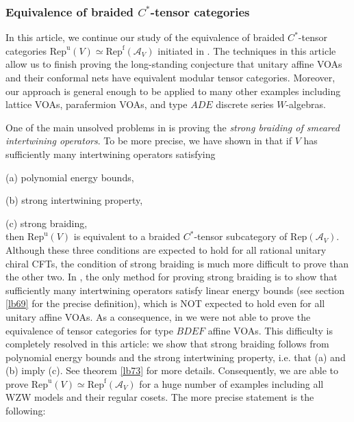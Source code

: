 \documentclass[11pt,b5paper,notitlepage]{article}
\theoremstyle{definition}
\theoremstyle{plain}
\newcommand{\mc}{\mathcal}
\newcommand{\Rep}{\mathrm{Rep}}
\newcommand{\Repu}{\mathrm{Rep}^{\mathrm u}}
\newcommand{\Repf}{\mathrm{Rep}^{\mathrm f}}
\newcommand{\RepuV}{\mathrm{Rep}^{\mathrm u}(V)}
\numberwithin{equation}{subsection}
\begin{document}
\subsubsection*{Equivalence of braided $C^*$-tensor categories}



In this article, we continue our study of the equivalence of braided  $C^*$-tensor categories $\RepuV\simeq\Repf(\mc A_V)$ initiated in \cite{Gui21a}. The techniques in this article allow us to finish proving the long-standing conjecture that unitary affine VOAs and their conformal nets have equivalent modular tensor categories. Moreover, our approach is general enough to be applied to many other examples  including lattice VOAs, parafermion VOAs, and type $ADE$ discrete series $W$-algebras.

One of the main unsolved problems in \cite{Gui21a} is proving the \emph{strong braiding of smeared intertwining operators}. To be more precise, we have shown in \cite{Gui21a}  that if $V$ has sufficiently many intertwining operators satisfying 

(a) polynomial energy bounds, 

(b) strong intertwining property,

(c) strong braiding,\\
then $\RepuV$ is equivalent to a braided $C^*$-tensor subcategory of $\Rep(\mc A_V)$. Although these three conditions are expected to hold for all rational unitary chiral CFTs, the condition of strong braiding is much more difficult to prove than the other two. In \cite{Gui21a}, the only method for proving strong braiding is to show that sufficiently many intertwining operators satisfy linear energy bounds (see section \ref{lb69} for the precise definition), which is NOT expected to hold even for all unitary affine VOAs. As a consequence, in \cite{Gui21a} we were not able to prove  the equivalence of tensor categories for type $BDEF$ affine VOAs. This difficulty is completely resolved in this article: we show that strong braiding follows from polynomial energy bounds and the strong intertwining property, i.e. that (a) and (b) imply (c). See theorem \ref{lb73} for more details. Consequently, we are able to prove $\Repu(V)\simeq\Repf(\mc A_V)$ for a huge number of examples including all WZW models and their regular cosets. The more precise statement is the following:
\end{document}
